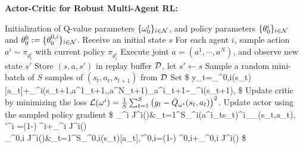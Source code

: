 \begin{algorithm}[thpb]
	\caption{\textbf{Actor-Critic for Robust Multi-Agent RL:} } 
	\label{alg:batch_AC}
	\begin{algorithmic}[1] 
		\STATE Initialization of Q-value parameters $\{\omega^i_0\}_{i\in\mathcal{N}}$, and policy parameters $\{\theta^i_0\}_{i\in\mathcal{N}}$ and $\theta^0_0:=\{\theta^{0,i}_0\}_{i\in\mathcal{N}}$.  
		\STATE Receive an initial state $s$ 
		\STATE For each agent $i$, sample action $a^i\sim \pi_{\theta^i_t}$ with current policy $ \pi_{\theta^i_t}$
		\STATE Execute joint $a=(a^1,\cdots,a^N)$, and observe 
		new state $s'$
		\STATE Store $(s,a,s')$ in replay buffer $\mathcal{D}$, let $s'\leftarrow s$
		\STATE Sample a random mini-batch of $S$ samples of $(s_t,a_t,s_{t+1})$ from $\mathcal{D}$
		\STATE Set  
		\$
		y_t=\pi_{\theta^{0,i}}(s_t)[a_t]+\gamma \oQ_{\omega^i}(s_{t+1},a^1_{t+1},\cdots,a^N_{t+1})\biggiven_{a^i_{t+1}\sim\pi_{\theta^i}(\cdot\given s_{t+1})},
		\$
		\STATE Update critic by minimizing the loss $\mathcal{L}(\omega^i)=\frac{1}{S}\sum_{t=1}^S\big(y_t-\bar{Q}_{\omega^i}(s_{t},a_{t})\big)^2$. 
		\STATE Update actor using the sampled policy gradient
		\$
		\nabla_{\theta^i} J^i(\theta)&\approx{}\sum_{t=1}^S\nabla\log\pi_{\theta^i}(a^i_t\given s_t)\oQ^i_{\tilde{\pi}_\theta}(s_t,a_t),~ 
		\theta'^i =(1-\tau) \theta^i+\tau\nabla_{\theta^i} J^i(\theta)\\
		\nabla_{\theta^{0,i}} J^i(\theta)&\approx{}\sum_{t=1}^S\nabla\pi_{\theta^{0,i}}(s_t)[a_t],\qquad\qquad\theta'^{0,i}=(1-\tau) \theta^{0,i}+\tau\nabla_{\theta^{0,i}} J^i(\theta)
		\$ 
		\ENDFOR
		\ENDFOR
		\ENDFOR
	\end{algorithmic}
\end{algorithm}
 


